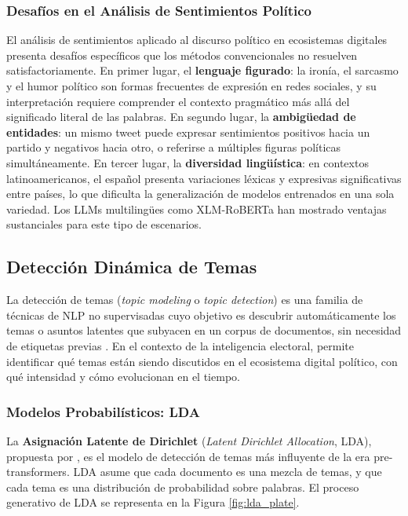\documentclass[listof=nochaptergap,12pt,times,authoryear]{report}
\let\cite\textcite
\begin{document}
\subsubsection{Desafíos en el Análisis de Sentimientos Político}
 
El análisis de sentimientos aplicado al discurso político en ecosistemas digitales presenta desafíos específicos que los métodos convencionales no resuelven satisfactoriamente. En primer lugar, el \textbf{lenguaje figurado}: la ironía, el sarcasmo y el humor político son formas frecuentes de expresión en redes sociales, y su interpretación requiere comprender el contexto pragmático más allá del significado literal de las palabras. En segundo lugar, la \textbf{ambigüedad de entidades}: un mismo tweet puede expresar sentimientos positivos hacia un partido y negativos hacia otro, o referirse a múltiples figuras políticas simultáneamente. En tercer lugar, la \textbf{diversidad lingüística}: en contextos latinoamericanos, el español presenta variaciones léxicas y expresivas significativas entre países, lo que dificulta la generalización de modelos entrenados en una sola variedad. Los LLMs multilingües como XLM-RoBERTa han mostrado ventajas sustanciales para este tipo de escenarios.
 
\subsection{Detección Dinámica de Temas}
 
La detección de temas (\textit{topic modeling} o \textit{topic detection}) es una familia de técnicas de NLP no supervisadas cuyo objetivo es descubrir automáticamente los temas o asuntos latentes que subyacen en un corpus de documentos, sin necesidad de etiquetas previas \parencite{bk_blei2012lda}. En el contexto de la inteligencia electoral, permite identificar qué temas están siendo discutidos en el ecosistema digital político, con qué intensidad y cómo evolucionan en el tiempo.
 
\subsubsection{Modelos Probabilísticos: LDA}
 
La \textbf{Asignación Latente de Dirichlet} (\textit{Latent Dirichlet Allocation}, LDA), propuesta por \cite{bk_blei2012lda}, es el modelo de detección de temas más influyente de la era pre-transformers. LDA asume que cada documento es una mezcla de temas, y que cada tema es una distribución de probabilidad sobre palabras. El proceso generativo de LDA se representa en la Figura \ref{fig:lda_plate}.
 
\end{document}
